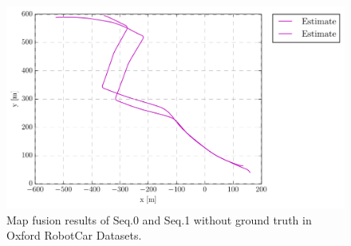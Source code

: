 \begin{figure}[H]
	\centering
	\includegraphics[width=5in]{Chapter4/robotcar/plots/trajectory_top_est_sim3_-1.pdf}
	\caption{Map fusion results of Seq.0 and Seq.1 without ground truth in Oxford RobotCar Datasets.}
	\label{fig:robotcarmfresult} 
\end{figure}



\newpage
